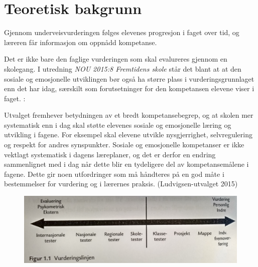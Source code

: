 \documentclass[main.tex]{subfiles}
\begin{document}
\section*{Teoretisk bakgrunn}
Gjennom underveisvurderingen følges elevenes progresjon i faget over tid, og læreren får informasjon
om oppnådd kompetanse.

Det er ikke bare den faglige vurderingen som skal evalureres gjennom en skolegang. 
I utredning \emph{NOU 2015:8 Fremtidens skole} står det blant at at den sosiale og 
emosjonelle utviklingen bør også ha større plass i vurderingsgrunnlaget enn det har idag, 
særskilt som forutsetninger for den kompetansen elevene viser i faget. :
\begin{displayquote}
Utvalget fremhever betydningen av et bredt kompetansebegrep,
og at skolen mer systematisk enn
i dag skal støtte elevenes sosiale og emosjonelle
læring og utvikling i fagene. For eksempel skal
elevene utvikle nysgjerrighet, selvregulering og
respekt for andres synspunkter. Sosiale og emosjonelle
kompetanser er ikke vektlagt systematisk
i dagens læreplaner, og det er derfor en endring
sammenlignet med i dag når dette blir en tydeligere
del av kompetansemålene i fagene. Dette
gir noen utfordringer som må håndteres på en
god måte i bestemmelser for vurdering og i lærernes
praksis. (Ludvigsen-utvalget 2015)
\end{displayquote}

\begin{figure}[h!]
\includegraphics[scale = 0.1]{../figures/vurderingslinjen.png}
\end{figure}
\end{document}
